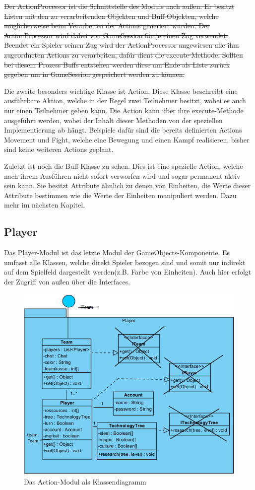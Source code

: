\documentclass[fontsize=12pt,paper=a4,twoside]{scrartcl}
\begin{document}
\sout{Der ActionProcessor ist die Schnittstelle des Moduls nach außen. Er besitzt Listen mit den zu verarbeitenden Objekten und Buff-Objekten, welche möglicherweise beim Verarbeiten der Actions generiert wurden. Der ActionProcessor wird dabei von GameSession für je einen Zug verwendet. Beendet ein Spieler seinen Zug wird der ActionProcessor angewiesen alle ihm zugeordneten Actions zu verarbeiten, dafür dient die execute-Methode. Sollten bei diesem Prozess Buffs entstehen werden diese am Ende als Liste zurück gegeben um in GameSession gespeichert werden zu können.}

Die zweite besonders wichtige Klasse ist Action. Diese Klasse beschreibt eine ausführbare Aktion, welche in der Regel zwei Teilnehmer besitzt, wobei es auch nur einen Teilnehmer geben kann. Die Action kann über ihre execute-Methode ausgeführt werden, wobei der Inhalt dieser Methoden von der speziellen Implementierung ab hängt. Beispiele dafür sind die bereits definierten Actions Movement und Fight, welche eine Bewegung und einen Kampf realisieren, bisher sind keine weiteren Actions geplant.

Zuletzt ist noch die Buff-Klasse zu sehen. Dies ist eine spezielle Action, welche nach ihrem Ausführen nicht sofort verworfen wird und sogar permanent aktiv sein kann. Sie besitzt Attribute ähnlich zu denen von Einheiten, die Werte dieser Attribute bestimmen wie die Werte der Einheiten manipuliert werden. Dazu mehr im nächsten Kapitel. 

\subsection{Player}
Das Player-Modul ist das letzte Modul der GameObjects-Komponente. Es umfasst alle Klassen, welche direkt Spieler bezogen sind und somit nur indirekt auf dem Spielfeld dargestellt werden(z.B. Farbe von Einheiten). Auch hier erfolgt der Zugriff von außen über die Interfaces.

\begin{figure}[h]
\centering
\includegraphics[width=1.0\linewidth]{PlayerClass}
\caption{Das Action-Modul als Klassendiagramm}
\label{fig:PlayerClass}
\end{figure}
\end{document}
